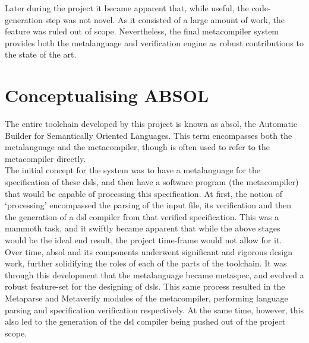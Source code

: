 Later during the project it became apparent that, while useful, the code-generation step was not novel.
As it consisted of a large amount of work, the feature was ruled out of scope.
Nevertheless, the final metacompiler system provides both the metalanguage and verification engine as robust contributions to the state of the art. 


\section{Conceptualising ABSOL} %
\label{sec:conceptualising_absol}
The entire toolchain developed by this project is known as \acrshort{absol}, the Automatic Builder for Semantically Oriented Languages. 
This term encompasses both the metalanguage and the metacompiler, though is often used to refer to the metacompiler directly.\\

The initial concept for the system was to have a metalanguage for the specification of these \glspl{dsl}, and then have a software program (the metacompiler) that would be capable of processing this specification.
At first, the notion of `processing' encompassed the parsing of the input file, its verification and then the generation of a \gls{dsl} compiler from that verified specification. 
This was a mammoth task, and it swiftly became apparent that while the above stages would be the ideal end result, the project time-frame would not allow for it.\\

Over time, \gls{absol} and its components underwent significant and rigorous design work, further solidifying the roles of each of the parts of the toolchain.
It was through this development that the metalanguage became \gls{metaspec}, and evolved a robust feature-set for the designing of \glspl{dsl}.
This same process resulted in the Metaparse and Metaverify modules of the metacompiler, performing language parsing and specification verification respectively.
At the same time, however, this also led to the generation of the \gls{dsl} compiler being pushed out of the project scope.


